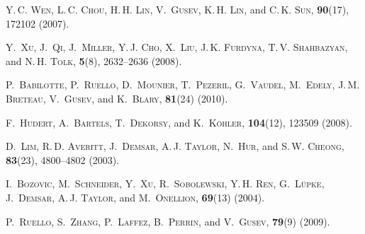 \documentclass[pss]{wiley2sp} %
\begin{document}
\begin{thebibliography}{[10]}
 \textsc{Y.\,C. Wen},  \textsc{L.\,C. Chou},  \textsc{H.\,H. Lin},
  \textsc{V.~Gusev},  \textsc{K.\,H. Lin},  and  \textsc{C.\,K. Sun},
  \textbf{90}(17), 172102 (2007).


 \textsc{Y.~Xu},  \textsc{J.~Qi},  \textsc{J.~Miller},  \textsc{Y.\,J. Cho},
  \textsc{X.~Liu},  \textsc{J.\,K. Furdyna},  \textsc{T.\,V. Shahbazyan},  and
  \textsc{N.\,H. Tolk},
  \textbf{5}(8), 2632--2636 (2008).


 \textsc{P.~Babilotte},  \textsc{P.~Ruello},  \textsc{D.~Mounier},
  \textsc{T.~Pezeril},  \textsc{G.~Vaudel},  \textsc{M.~Edely},  \textsc{J.\,M.
  Breteau},  \textsc{V.~Gusev},  and  \textsc{K.~Blary},
  \textbf{81}(24) (2010).


 \textsc{F.~Hudert},  \textsc{A.~Bartels},  \textsc{T.~Dekorsy},  and
  \textsc{K.~K{\"o}hler},
  \textbf{104}(12), 123509 (2008).


 \textsc{D.~Lim},  \textsc{R.\,D. Averitt},  \textsc{J.~Demsar},
  \textsc{A.\,J. Taylor},  \textsc{N.~Hur},  and  \textsc{S.\,W.
  Cheong},
  \textbf{83}(23), 4800--4802 (2003).


 \textsc{I.~Bozovic},  \textsc{M.~Schneider},  \textsc{Y.~Xu},
  \textsc{R.~Sobolewski},  \textsc{Y.\,H. Ren},  \textsc{G.~Lüpke},
  \textsc{J.~Demsar},  \textsc{A.\,J. Taylor},  and
  \textsc{M.~Onellion},
  \textbf{69}(13) (2004).


 \textsc{P.~Ruello},  \textsc{S.~Zhang},  \textsc{P.~Laffez},
  \textsc{B.~Perrin},  and  \textsc{V.~Gusev},
  \textbf{79}(9) (2009).



\end{thebibliography}
\end{document}
